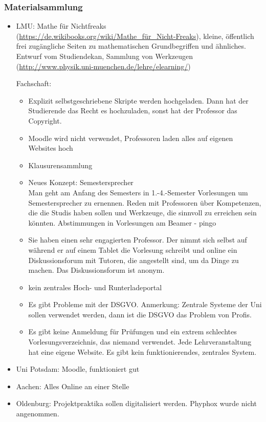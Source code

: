 \subsubsection*{Materialsammlung}
	\begin{itemize}
		\item LMU: Mathe für Nichtfreaks (\url{https://de.wikibooks.org/wiki/Mathe_für_Nicht-Freaks}), kleine, öffentlich frei zugängliche Seiten zu mathematischen Grundbegriffen und ähnliches.
			Entwurf vom Studiendekan, Sammlung von Werkzeugen (\url{http://www.physik.uni-muenchen.de/lehre/elearning/})

			Fachschaft:
			\begin{itemize}
				\item Explizit selbstgeschriebene Skripte werden hochgeladen. Dann hat der Studierende das Recht es hochzuladen, sonst hat der Professor das Copyright.\\

				\item Moodle wird nicht verwendet, Professoren laden alles auf eigenen Websites hoch
				\item Klausurensammlung

				\item Neues Konzept:
				Semestersprecher \\
				Man geht am Anfang des Semesters in 1.-4.-Semester Vorlesungen um Semestersprecher zu ernennen.
				Reden mit Professoren über Kompetenzen, die die Studis haben sollen und Werkzeuge, die sinnvoll zu erreichen sein könnten.
				Abstimmungen in Vorlesungen am Beamer - pingo

				\item Sie haben einen sehr engagierten Professor.
				Der nimmt sich selbst auf während er auf einem Tablet die Vorlesung schreibt
				und online ein Diskussionsforum mit Tutoren, die angestellt sind, um da Dinge zu machen.
				Das Diskussionsforum ist anonym.

				\item kein zentrales Hoch- und Runterladeportal

				\item Es gibt Probleme mit der DSGVO.
				Anmerkung: Zentrale Systeme der Uni sollen verwendet werden, dann ist die DSGVO das Problem von Profis.

				\item Es gibt keine Anmeldung für Prüfungen und ein extrem schlechtes Vorlesungsverzeichnis, das niemand verwendet.
				Jede Lehrveranstaltung hat eine eigene Website. Es gibt kein funktionierendes, zentrales System.
			\end{itemize}
			\item Uni Potsdam: Moodle, funktioniert gut
			\item Aachen: Alles Online an einer Stelle
			\item Oldenburg: Projektpraktika sollen digitalisiert werden. Phyphox wurde nicht angenommen.
	\end{itemize}

